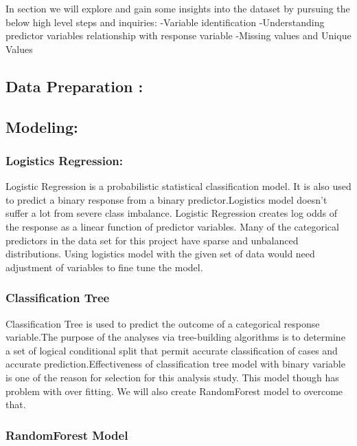 \documentclass[english,floatsintext,man]{apa6}
\begin{document}
In section we will explore and gain some insights into the dataset by
pursuing the below high level steps and inquiries: -Variable
identification -Understanding predictor variables relationship with
response variable -Missing values and Unique Values

\subsection{Data Preparation :}\label{data-preparation-2}

\subsection{Modeling:}\label{modeling}

\subsubsection{Logistics Regression:}\label{logistics-regression}

Logistic Regression is a probabilistic statistical classification model.
It is also used to predict a binary response from a binary
predictor.Logistics model doesn't suffer a lot from severe class
imbalance. Logistic Regression creates log odds of the response as a
linear function of predictor variables. Many of the categorical
predictors in the data set for this project have sparse and unbalanced
distributions. Using logistics model with the given set of data would
need adjustment of variables to fine tune the model.

\subsubsection{Classification Tree}\label{classification-tree}

Classification Tree is used to predict the outcome of a categorical
response variable.The purpose of the analyses via tree-building
algorithms is to determine a set of logical conditional split that
permit accurate classification of cases and accurate
prediction.Effectiveness of classification tree model with binary
variable is one of the reason for selection for this analysis study.
This model though has problem with over fitting. We will also create
RandomForest model to overcome that.

\subsubsection{RandomForest Model}\label{randomforest-model}
\end{document}

